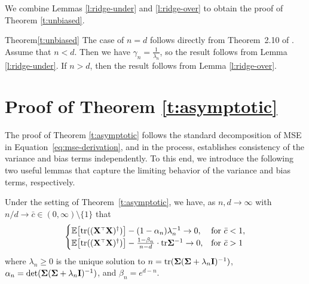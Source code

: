 \noindent
We combine Lemmas \ref{l:ridge-under} and \ref{l:ridge-over} to obtain
the proof of Theorem \ref{t:unbiased}.
\begin{proofof}{Theorem}{\ref{t:unbiased}}
The case of $n=d$ follows directly from Theorem~2.10 of
\cite{correcting-bias}.
Assume that $n<d$. Then we have
$\gamma_n=\frac1{\lambda_n}$, so the result follows
from Lemma \ref{l:ridge-under}.
If $n>d$, then the result follows from Lemma \ref{l:ridge-over}.
\end{proofof}

\section{Proof of Theorem \ref{t:asymptotic}}
\label{sec:proof-of-t-asymptotic}

The proof of Theorem \ref{t:asymptotic} follows the standard decomposition of
MSE in Equation~\ref{eq:mse-derivation}, and in the process,
establishes consistency of the variance and bias terms
independently. To this end, we introduce the following two useful
lemmas that capture the limiting behavior of the 
variance and bias terms, respectively.

\begin{lemma}\label{c:wishart}
  Under the setting of Theorem~\ref{t:asymptotic}, we have, as $n,d \to \infty$
with $n/d \to \bar c \in (0, \infty) \setminus \{ 1 \}$ that
\begin{align}
\begin{cases}
  \E\big[\tr((\X^\top \X)^\dagger)\big] - (1-\alpha_n) \lambda_n^{-1} \to 0, & \text{for }\bar c < 1, \\
  \E\big[\tr((\X^\top \X)^\dagger)\big] - \frac{1-\beta_n}{n - d} \cdot \tr \Sigmab^{-1} \to 0, & \text{for }\bar c > 1
\end{cases}
\label{eq:wishart}
\end{align}
where $\lambda_n\geq 0$ is the unique solution to
$n=\mathrm{tr}(\mathbf{\Sigma}(\mathbf{\Sigma}+\lambda_n\mathbf I)^{-1})$,
$\alpha_n=\det(\mathbf{\Sigma}(\mathbf{\Sigma}+\lambda_n\mathbf I)^{-1})$,
and $\beta_n = e^{d-n}$.
\end{lemma}

